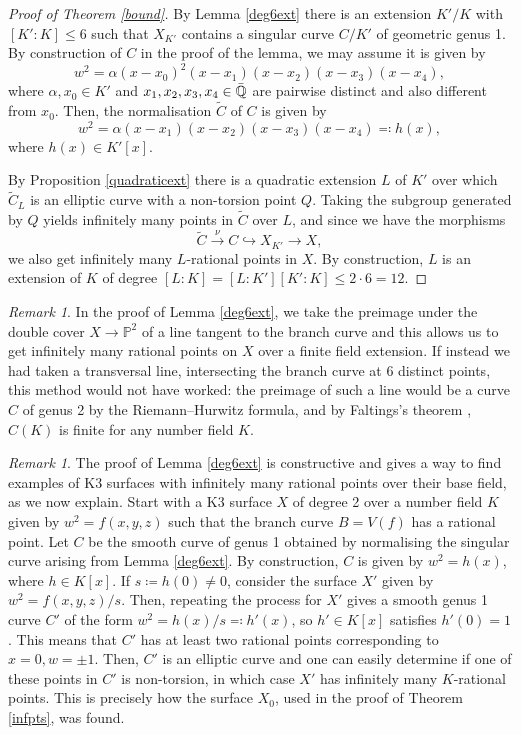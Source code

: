 \documentclass[11pt]{amsart}
\newcommand{\QQ}{\mathbb{Q}}
\newcommand{\PP}{\mathbb{P}}
\theoremstyle{plain}
\theoremstyle{remark}
\newtheorem{remark}[lemma]{Remark}
\begin{document}
\begin{proof}[Proof of Theorem \ref{bound}]
By Lemma \ref{deg6ext} there is an extension $K'/K$ with $[K' : K]\leq 6$ such that $X_{K'}$ contains a singular curve $C/K'$ of geometric genus 1. By construction of $C$ in the proof of the lemma, we may assume it is given by 
\[
w^2=\alpha (x-x_0)^2(x-x_1)(x-x_2)(x-x_3)(x-x_4),
\]
where $\alpha,x_0\in K'$ and $x_1,x_2,x_3,x_4\in \Bar{\QQ}$ are pairwise distinct and also different from $x_0$. Then, the normalisation $\widetilde{C}$ of $C$ is given by 
\[
w^2=\alpha (x-x_1)(x-x_2)(x-x_3)(x-x_4)\eqcolon h(x),
\]
where $h(x)\in K'[x]$. 


By Proposition \ref{quadraticext} there is a quadratic extension $L$ of $K'$ over which $\widetilde{C}_L$ is an elliptic curve with a non-torsion point $Q$. Taking the subgroup generated by $Q$ yields infinitely many points in $\widetilde{C}$ over
$L$,
and since we have the morphisms 
\[
\widetilde{C} \xrightarrow{\nu} C \hookrightarrow X_{K'} \rightarrow X,
\]
we also get infinitely many $L$-rational points in $X$. By construction, $L$ is an extension of $K$ of degree $[L : K]=[L: K'][K': K]\leq 2\cdot 6 =12$.
\end{proof}

\begin{remark}
In the proof of Lemma \ref{deg6ext}, we take the preimage under the double cover $X\rightarrow \PP^2$ of a line tangent to the branch curve and this allows us to get infinitely many rational points on $X$ over a finite field extension. If instead we had taken a transversal line, intersecting the branch curve at 6 distinct points, this method would not have worked: the preimage of such a line would be a curve $C$ of genus 2 by the Riemann--Hurwitz formula, and by Faltings's theorem  \cite{faltings}, $C(K)$ is finite for any number field $K$.
\end{remark}

\begin{remark} \label{rem:constructive}
The proof of Lemma \ref{deg6ext} is constructive and gives a way to find examples of K3 surfaces with infinitely many rational points over their base field, as we now explain. Start with a K3 surface $X$ of degree 2 over a number field $K$ given by $w^2=f(x,y,z)$ such that the branch curve $B=V(f)$ has a rational point. Let $C$ be the smooth curve of genus 1 obtained by normalising the singular curve arising from Lemma \ref{deg6ext}. By construction, $C$ is given by $w^2=h(x)$, where $h\in K[x]$. If $s\coloneqq h(0)\neq 0$, consider the surface $X'$ given by $w^2=f(x,y,z)/s$. Then, repeating the process for $X'$ gives a smooth genus 1 curve $C'$ of the form $w^2=h(x)/s\eqqcolon h'(x)$, so $h'\in K[x]$ satisfies $h'(0)=1$. This means that $C'$ has at least two rational points corresponding to $x=0, w=\pm 1$. Then, $C'$ is an elliptic curve and one can easily determine if one of these points in $C'$ is non-torsion, in which case $X'$ has infinitely many $K$-rational points. This is precisely how the surface $X_0$, used in the proof of Theorem \ref{infpts}, was found.
\end{remark}
\end{document}
